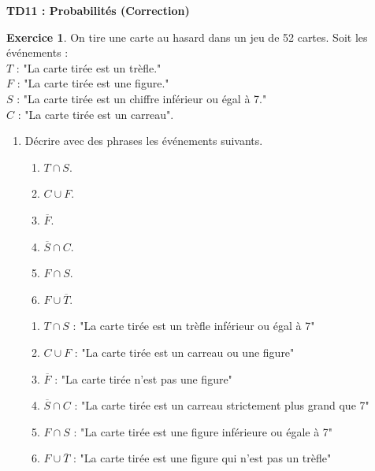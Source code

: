 \documentclass[12pt,a4paper]{article}
\theoremstyle{definition}
\newtheorem{exo}{Exercice}
\begin{document}
\begin{center}

\Large
\textbf{{TD11 : Probabilités (\textbf{Correction})}}\\


\end{center}

\begin{exo}
On tire une carte au hasard dans un jeu de 52 cartes. Soit les événements : \\
$T$ : "La carte tirée est un trèfle." \\
$F$ : "La carte tirée est une figure." \\
$S$ : "La carte tirée est un chiffre inférieur ou égal à 7." \\
$C$ : "La carte tirée est un carreau". 


\begin{enumerate}
   
    \item Décrire avec des phrases les événements suivants.
    \begin{multicols}{3}
    

    \begin{enumerate}
        \item $T \cap S$.
        \item $C \cup F$.
        \item $\overline{F}$.
        \item $\overline{S} \cap C$.
        \item $F \cap S$.
        \item $F \cup \overline{T}$.
    \end{enumerate}
        \end{multicols}

\begin{rep}{}{}

\begin{enumerate}
        \item $T \cap S$ : "La carte tirée est un trèfle inférieur ou égal à 7"
        \item $C \cup F$ : "La carte tirée est un carreau ou une figure"
        \item $\overline{F}$ : "La carte tirée n'est pas une figure"
        \item $\overline{S} \cap C$ : "La carte tirée est un carreau strictement plus grand que 7"
        \item $F \cap S$ : "La carte tirée est une figure inférieure ou égale à 7"
        \item $F \cup \overline{T}$ : "La carte tirée est une figure qui n'est pas un trèfle"
    \end{enumerate}


\end{rep}
\end{enumerate}
\end{exo}
\end{document}
